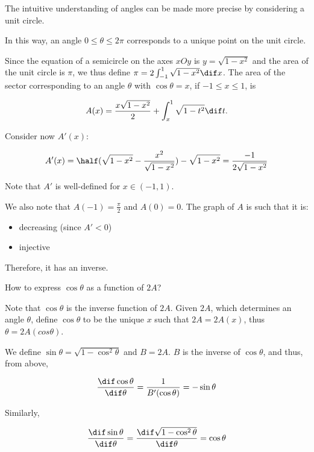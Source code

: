 \documentclass[11pt]{scrartcl}
\begin{document}
The intuitive understanding of angles can be made more precise by
considering a unit circle.

In this way, an angle $0\leq \theta \leq 2\pi$ corresponds to a unique
point on the unit circle.

Since the equation of a semicircle on the axes $xOy$ is
$y = \sqrt{1-x^{2}}$ and the area of the unit circle is $\pi$, we thus
define $\pi = 2\int_{-1}^1\sqrt{1-x^{2}}\dif x$. The area of the
sector corresponding to an angle $\theta$ with $\cos \theta = x$, if
$-1 \leq x \leq 1$, is


\begin{equation*}
A(x) = \frac{x\sqrt{1-x^2}}{2} + \int_x^1\sqrt{1-t^2} \dif t.
\end{equation*}

Consider now $A'(x)$:


\begin{equation*}
  A'(x) = \half(\sqrt{1-x^2} - \frac{x^{2}}{ \sqrt{1-x^2}}) - \sqrt{1-x^{2}} = \frac{-1}{2 \sqrt{1-x^{2}} }
\end{equation*}

Note that $A'$ is well-defined for $x \in (-1, 1)$.

We also note that $A(-1) = \frac{\pi}{2}$ and $A(0) = 0$. The graph of $A$ is such that it is:

\begin{itemize}
\item decreasing (since $A' < 0$)
\item injective
\end{itemize}
Therefore, it has an inverse.

\begin{ques*}

How to express $\cos \theta$ as a function of $2A$?

\end{ques*}

\begin{answer*}

  Note that $\cos \theta$ is the inverse function of $2A$. Given
  $2A$, which determines an angle $\theta$, define $\cos \theta$ to be
  the unique $x$ such that $2A = 2A(x)$, thus
  $\theta = 2A(cos \theta)$.

\end{answer*}

We define $\sin \theta = \sqrt{1-\cos^2\theta}$ and $B = 2A$. $B$ is
the inverse of $\cos \theta$, and thus, from above,


\begin{equation*}
  \frac{\dif \cos \theta}{\dif \theta } = \frac{1}{B'(\cos\theta)} = - \sin \theta
\end{equation*}

Similarly,

\begin{equation*}
  \frac{\dif \sin \theta}{\dif \theta } = \frac{\dif  \sqrt{1 - \cos^{2}\theta}}{\dif \theta} = \cos \theta
\end{equation*}
\end{document}
